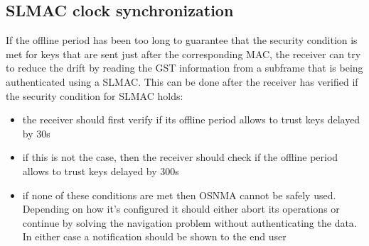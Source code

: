 
\subsection{SLMAC clock synchronization}
If the offline period has been too long to guarantee that the security condition
is met for keys that are sent just after the corresponding MAC, the receiver can
try to reduce the drift by reading the GST information from a subframe that is
being authenticated using a SLMAC. This can be done after the receiver has
verified if the security condition for SLMAC holds:
\begin{itemize}
  \item the receiver should first verify if its offline period allows to trust
    keys delayed by \num{30}\si{s}
  \item if this is not the case, then the receiver should check if the offline
    period allows to trust keys delayed by \num{300}\si{s}
  \item if none of these conditions are met then OSNMA cannot be safely used.
    Depending on how it's configured it should either abort its operations or
    continue by solving the navigation problem without authenticating the data.
    In either case a notification should be shown to the end user
\end{itemize}

